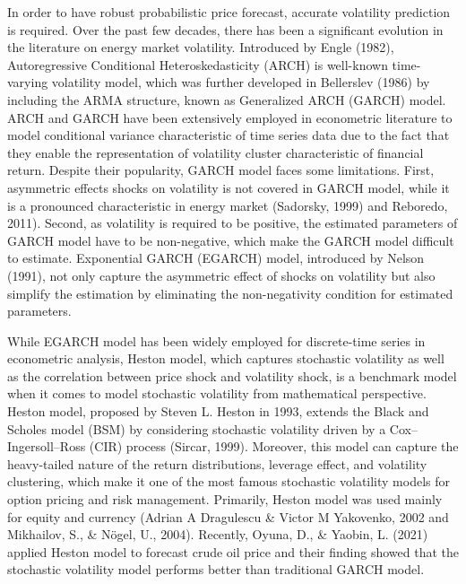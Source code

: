 \documentclass[12pt,a4paper]{article}
\numberwithin{equation}{section}
\begin{document}
In order to have robust probabilistic price forecast, accurate volatility prediction is required. Over the past few decades, there has been a significant evolution in the literature on energy market volatility. Introduced by Engle (1982), Autoregressive Conditional Heteroskedasticity (ARCH) is well-known time-varying volatility model, which was further developed in Bellerslev (1986) by including the ARMA structure, known as Generalized ARCH (GARCH) model. ARCH and GARCH have been extensively employed in econometric literature to model conditional variance characteristic of time series data due to the fact that they enable the representation of volatility cluster characteristic of financial return. Despite their popularity, GARCH model faces some limitations. First, asymmetric effects shocks on volatility is not covered in GARCH model, while it is a pronounced characteristic in energy market (Sadorsky, 1999) and Reboredo, 2011). Second, as volatility is required to be positive, the estimated parameters of GARCH model have to be non-negative, which make the GARCH model difficult to estimate. Exponential GARCH (EGARCH) model, introduced by Nelson (1991), not only capture the asymmetric effect of shocks on volatility but also simplify the estimation by eliminating the non-negativity condition for estimated parameters. 

While EGARCH model has been widely employed for discrete-time series in econometric analysis, Heston model, which captures stochastic volatility as well as the correlation between price shock and volatility shock, is a benchmark model when it comes to model stochastic volatility from mathematical perspective. Heston model, proposed by Steven L. Heston in 1993, extends the Black and Scholes model (BSM) by considering stochastic volatility driven by a Cox–Ingersoll–Ross (CIR) process (Sircar, 1999). Moreover, this model can capture the heavy-tailed nature of the return distributions, leverage effect, and volatility clustering, which make it one of the most famous stochastic volatility models for option pricing and risk management. Primarily, Heston model was used mainly for equity and currency (Adrian A Dragulescu \& Victor M Yakovenko, 2002 and Mikhailov, S., \& Nögel, U., 2004). Recently, Oyuna, D., \& Yaobin, L. (2021) applied Heston model to forecast crude oil price and their finding showed that the stochastic volatility model performs better than traditional GARCH model. 
\end{document}

